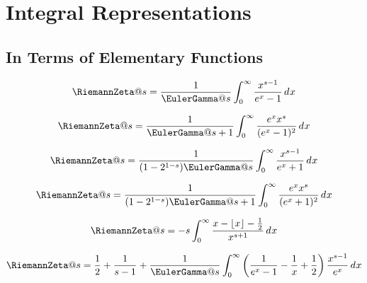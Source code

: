 \documentclass{article}
\begin{document}
\section{Integral Representations}\label{sec:ZE.INT}
 

\subsection{In Terms of Elementary Functions}\label{sec:ZE.INT.EL}%

\begin{equation}\label{eq:ZE.INT.EL1}
  \RiemannZeta@{s}
  = \frac{1}{\EulerGamma@{s}}
    \int_0^\infty \frac{x^{s-1}}{\expe^x-1} \diff{x}
\end{equation}

\begin{equation}\label{eq:ZE.INT.EL2}
  \RiemannZeta@{s}
  = \frac{1}{\EulerGamma@{s+1}}
    \int_0^\infty \frac{\expe^x x^s}{(\expe^x-1)^2} \diff{x}
\end{equation}

\begin{equation}\label{eq:ZE.INT.EL3}
  \RiemannZeta@{s}
  = \frac{1}{(1 - 2^{1-s}) \EulerGamma@{s}}
    \int_0^\infty \frac{x^{s-1}}{\expe^x+1} \diff{x}
\end{equation}

\begin{equation}\label{eq:ZE.INT.EL4}
  \RiemannZeta@{s}
  = \frac{1}{(1 - 2^{1-s}) \EulerGamma@{s+1}}
    \int_0^\infty \frac{\expe^x x^s}{(\expe^x+1)^2} \diff{x}
\end{equation}

\begin{equation}\label{eq:ZE.INT.EL5}
  \RiemannZeta@{s}
  = -s \int_0^\infty \frac{x-\floor{x}-\frac{1}{2}}{x^{s+1}} \diff{x}
\end{equation}

\begin{equation}\label{eq:ZE.INT.EL6}
  \RiemannZeta@{s}
  = \frac{1}{2} + \frac{1}{s-1}
  + \frac{1}{\EulerGamma@{s}}
    \int_0^\infty
        \left( \frac{1}{\expe^x-1} - \frac{1}{x} + \frac{1}{2} \right)
        \frac{x^{s-1}}{\expe^x}
    \diff{x}
\end{equation}
\end{document}
